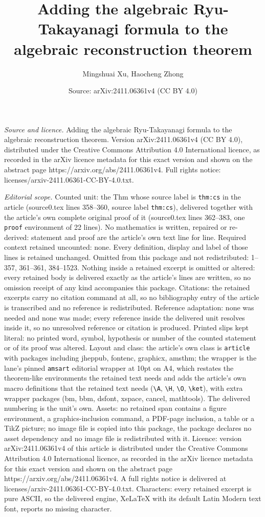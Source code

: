 \documentclass[10pt,a4paper]{amsart}
\title[Adding the algebraic Ryu-Takayanagi formula to the algebraic]{Adding the algebraic Ryu-Takayanagi formula to the algebraic reconstruction theorem}
\author{Mingshuai Xu, Haocheng Zhong}
\date{Source: arXiv:2411.06361v4 (CC BY 4.0)}
\begin{document}
\maketitle

\noindent\emph{Source and licence.} Adding the algebraic Ryu-Takayanagi formula to the algebraic reconstruction theorem. Version arXiv:2411.06361v4 (CC BY 4.0), distributed under the Creative Commons Attribution 4.0 International licence, as recorded in the arXiv licence metadata for this exact version and shown on the abstract page https://arxiv.org/abs/2411.06361v4. Full rights notice: licenses/arxiv-2411.06361-CC-BY-4.0.txt.\par\smallskip

\noindent\textit{Editorial scope.} Counted unit: the Thm whose source label is \texttt{thm:cs} in the article (source0.tex lines 358--360, source label \texttt{thm:cs}), delivered together with the article's own complete original proof of it (source0.tex lines 362--383, one \texttt{proof} environment of 22 lines). No mathematics is written, repaired or re-derived: statement and proof are the article's own text line for line. Required context retained uncounted: none. Every definition, display and label of those lines is retained unchanged. Omitted from this package and not redistributed: 1--357, 361--361, 384--1523. Nothing inside a retained excerpt is omitted or altered: every retained body is delivered exactly as the article's lines are written, so no omission receipt of any kind accompanies this package. Citations: the retained excerpts carry no citation command at all, so no bibliography entry of the article is transcribed and no reference is redistributed. Reference adaptation: none was needed and none was made; every reference inside the delivered unit resolves inside it, so no unresolved reference or citation is produced. Printed slips kept literal: no printed word, symbol, hypothesis or number of the counted statement or of its proof was altered. Layout and class: the article's own class is \texttt{article} with packages including jheppub, fontenc, graphicx, amsthm; the wrapper is the lane's pinned \texttt{amsart} editorial wrapper at 10pt on A4, which restates the theorem-like environments the retained text needs and adds the article's own macro definitions that the retained text needs (\texttt{\textbackslash A}, \texttt{\textbackslash H}, \texttt{\textbackslash O}, \texttt{\textbackslash ket}), with extra wrapper packages (bm, bbm, dsfont, xspace, cancel, mathtools). The delivered numbering is the unit's own. Assets: no retained span contains a figure environment, a graphics-inclusion command, a PDF-page inclusion, a table or a TikZ picture; no image file is copied into this package, the package declares no asset dependency and no image file is redistributed with it. Licence: version arXiv:2411.06361v4 of this article is distributed under the Creative Commons Attribution 4.0 International licence, as recorded in the arXiv licence metadata for this exact version and shown on the abstract page https://arxiv.org/abs/2411.06361v4. A full rights notice is delivered at licenses/arxiv-2411.06361-CC-BY-4.0.txt. Characters: every retained excerpt is pure ASCII, so the delivered engine, XeLaTeX with its default Latin Modern text font, reports no missing character.
\end{document}
